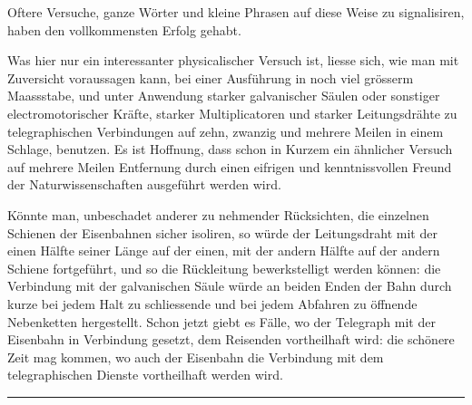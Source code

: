 \documentclass[12pt,a4paper]{article}
\begin{document}
Oftere Versuche, ganze Wörter und kleine Phrasen auf diese Weise zu signalisiren, haben den vollkommensten Erfolg gehabt.

Was hier nur ein interessanter physicalischer Versuch ist, liesse sich, wie man mit Zuversicht voraussagen kann, bei einer Ausführung in noch viel grösserm Maassstabe, und unter Anwendung starker galvanischer Säulen oder sonstiger electromotorischer Kräfte, starker Multiplicatoren und starker Leitungsdrähte zu telegraphischen Verbindungen auf zehn, zwanzig und mehrere Meilen in einem Schlage, benutzen. Es ist Hoffnung, dass schon in Kurzem ein ähnlicher Versuch auf mehrere Meilen Entfernung durch einen eifrigen und kenntnissvollen Freund der Naturwissenschaften ausgeführt werden wird.

\bigskip

Könnte man, unbeschadet anderer zu nehmender Rücksichten, die einzelnen Schienen der Eisenbahnen sicher isoliren, so würde der Leitungsdraht mit der einen Hälfte seiner Länge auf der einen, mit der andern Hälfte auf der andern Schiene fortgeführt, und so die Rückleitung bewerkstelligt werden können: die Verbindung mit der galvanischen Säule würde an beiden Enden der Bahn durch kurze bei jedem Halt zu schliessende und bei jedem Abfahren zu öffnende Nebenketten hergestellt. Schon jetzt giebt es Fälle, wo der Telegraph mit der Eisenbahn in Verbindung gesetzt, dem Reisenden vortheilhaft wird: die schönere Zeit mag kommen, wo auch der Eisenbahn die Verbindung mit dem telegraphischen Dienste vortheilhaft werden wird.

\vspace{2em}

\begin{center}
    \rule{0.5\textwidth}{0.4pt}
\end{center}

\vspace{2em}

\tableofcontents
\end{document}
